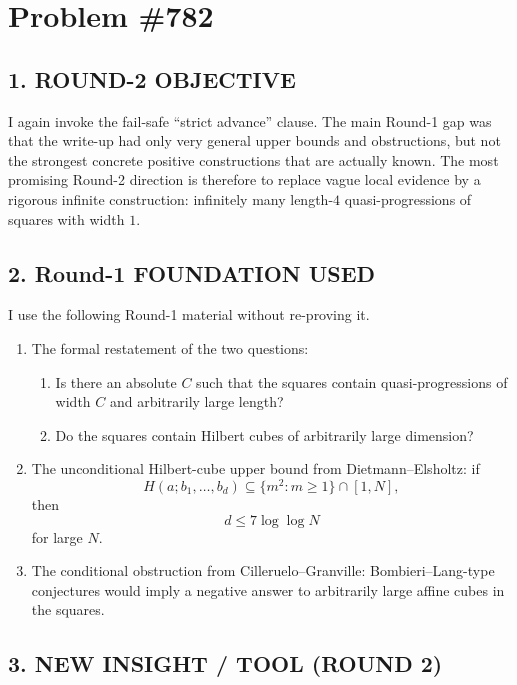 \section{Problem \#782}

\subsection*{1. ROUND-2 OBJECTIVE}

I again invoke the fail-safe ``strict advance'' clause. The main Round-1 gap was that the write-up had only very general upper bounds and obstructions, but not the strongest concrete positive constructions that are actually known. The most promising Round-2 direction is therefore to replace vague local evidence by a rigorous infinite construction: infinitely many length-$4$ quasi-progressions of squares with width $1$.

\subsection*{2. Round-1 FOUNDATION USED}

I use the following Round-1 material without re-proving it.

\begin{enumerate}
\item The formal restatement of the two questions:
\begin{enumerate}
\item[(Q1)] Is there an absolute $C$ such that the squares contain quasi-progressions of width $C$ and arbitrarily large length?
\item[(Q2)] Do the squares contain Hilbert cubes of arbitrarily large dimension?
\end{enumerate}
\item The unconditional Hilbert-cube upper bound from Dietmann--Elsholtz:
if
\[
H(a;b_1,\dots,b_d)\subseteq \{m^2:m\geq 1\}\cap[1,N],
\]
then
\[
d \leq 7 \log\log N
\]
for large $N$.
\item The conditional obstruction from Cilleruelo--Granville: Bombieri--Lang-type conjectures would imply a negative answer to arbitrarily large affine cubes in the squares.
\end{enumerate}

\subsection*{3. NEW INSIGHT / TOOL (ROUND 2)}

